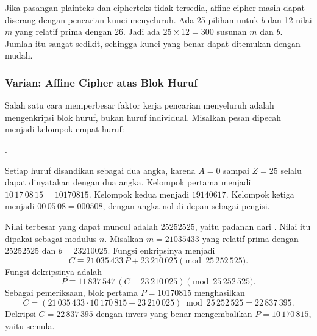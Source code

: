 Jika pasangan plainteks dan cipherteks tidak tersedia, affine cipher masih
dapat diserang dengan pencarian kunci menyeluruh. Ada 25 pilihan untuk $b$ dan
12 nilai $m$ yang relatif prima dengan 26. Jadi ada $25 \times 12 = 300$
susunan $m$ dan $b$. Jumlah itu sangat sedikit, sehingga kunci yang benar
dapat ditemukan dengan mudah.

\subsubsection{Varian: Affine Cipher atas Blok Huruf}

Salah satu cara memperbesar faktor kerja pencarian menyeluruh adalah
mengenkripsi blok huruf, bukan huruf individual. Misalkan pesan
 dipecah menjadi kelompok empat huruf:
\begin{center}
.
\end{center}
Setiap huruf disandikan sebagai dua angka, karena $A=0$ sampai $Z=25$ selalu
dapat dinyatakan dengan dua angka. Kelompok pertama menjadi
$10\,17\,08\,15=10170815$. Kelompok kedua menjadi $19140617$. Kelompok ketiga
menjadi $00\,05\,08=000508$, dengan angka nol di depan sebagai pengisi.

Nilai terbesar yang dapat muncul adalah $25252525$, yaitu padanan dari
. Nilai itu dipakai sebagai modulus $n$. Misalkan $m=21035433$
yang relatif prima dengan $25252525$ dan $b=23210025$. Fungsi enkripsinya
menjadi
\[
C \equiv 21\,035\,433\,P + 23\,210\,025 \pmod{25\,252\,525}.
\]
Fungsi dekripsinya adalah
\[
P \equiv 11\,837\,547\,(C - 23\,210\,025) \pmod{25\,252\,525}.
\]
Sebagai pemeriksaan, blok pertama $P=10170815$ menghasilkan
\[
C = (21\,035\,433 \cdot 10\,170\,815 + 23\,210\,025) \bmod 25\,252\,525
= 22\,837\,395.
\]
Dekripsi $C=22\,837\,395$ dengan invers yang benar mengembalikan
$P=10\,170\,815$, yaitu  semula.
